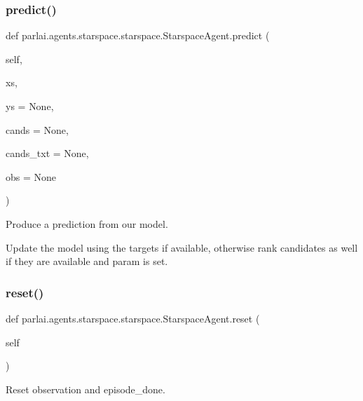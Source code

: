 \subsubsection{\texorpdfstring{predict()}{predict()}}
{\footnotesize\ttfamily def parlai.\+agents.\+starspace.\+starspace.\+Starspace\+Agent.\+predict (\begin{DoxyParamCaption}\item[{}]{self,  }\item[{}]{xs,  }\item[{}]{ys = {\ttfamily None},  }\item[{}]{cands = {\ttfamily None},  }\item[{}]{cands\+\_\+txt = {\ttfamily None},  }\item[{}]{obs = {\ttfamily None} }\end{DoxyParamCaption})}

\begin{DoxyVerb}Produce a prediction from our model.

Update the model using the targets if available, otherwise rank candidates as
well if they are available and param is set.
\end{DoxyVerb}
 \mbox{\label{classparlai_1_1agents_1_1starspace_1_1starspace_1_1StarspaceAgent_a4d5057250faeae3f3812603469daa282}} 
\subsubsection{\texorpdfstring{reset()}{reset()}}
{\footnotesize\ttfamily def parlai.\+agents.\+starspace.\+starspace.\+Starspace\+Agent.\+reset (\begin{DoxyParamCaption}\item[{}]{self }\end{DoxyParamCaption})}

\begin{DoxyVerb}Reset observation and episode_done.
\end{DoxyVerb}
 \mbox{\label{classparlai_1_1agents_1_1starspace_1_1starspace_1_1StarspaceAgent_a763de34b8d6464cbaa1ba17bf83f7df0}} 
